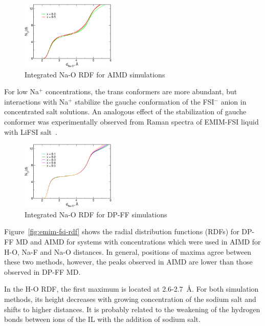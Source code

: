 \begin{figure}[ht]
    \centering
    \includegraphics[width=0.4\textwidth]{img/3-structural-data-from-md-simulations/1-emim-fsi/rdf/rdf-na-o-int-aimd.png}
    \caption{Integrated Na-O RDF for AIMD simulations}
    \label{fig:emim-fsi-rdf-na-o-int-aimd}
\end{figure}

For low Na$^{+}$ concentrations, the trans conformers are more abundant, but interactions with Na$^{+}$ stabilize the gauche conformation of the FSI$^{-}$ anion in concentrated salt solutions. An analogous effect of the stabilization of gauche conformer was experimentally observed from Raman spectra of EMIM-FSI liquid with LiFSI salt~\cite{li-emim-fsi-solvation}.

\begin{figure}[ht]
    \centering
    \includegraphics[width=0.4\textwidth]{img/3-structural-data-from-md-simulations/1-emim-fsi/rdf/rdf-na-o-int-dpff.png}
    \caption{Integrated Na-O RDF for DP-FF simulations}
    \label{fig:emim-fsi-rdf-na-o-int-dpff}
\end{figure}

Figure~\ref{fig:emim-fsi-rdf} shows the radial distribution functions (RDFs) for DP-FF MD and AIMD for systems with concentrations which were used in AIMD for H-O, Na-F and Na-O distances. In general, positions of maxima agree between these two methods, however, the peaks observed in AIMD are lower than those observed in DP-FF MD.

In the H-O RDF, the first maximum is located at 2.6-2.7~{\AA}. For both simulation methods, its height decreases with growing concentration of the sodium salt and shifts to higher distances. It is probably related to the weakening of the hydrogen bonds between ions of the IL with the addition of sodium salt.

